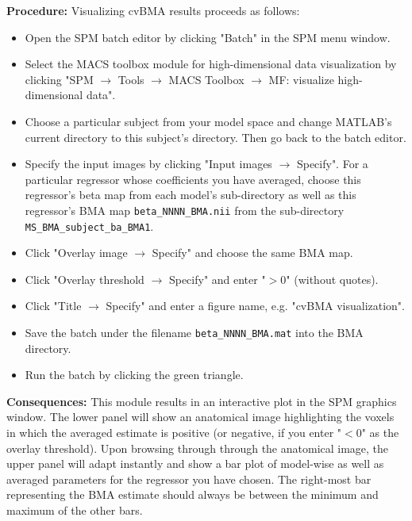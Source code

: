 \documentclass[a4paper,12pt]{article}
\newcommand{\ra}{$\rightarrow$ }
\begin{document}
\textbf{Procedure:} Visualizing cvBMA results proceeds as follows:
\begin{itemize}
	
\item
Open the SPM batch editor by clicking "Batch" in the SPM menu window.

\item
Select the MACS toolbox module for high-dimensional data visualization by clicking "SPM \ra Tools \ra MACS Toolbox \ra MF: visualize high-dimensional data".

\item
Choose a particular subject from your model space and change MATLAB's current directory to this subject's directory. Then go back to the batch editor.

\item
Specify the input images by clicking "Input images \ra Specify". For a particular regressor whose coefficients you have averaged, choose this regressor's beta map from each model's sub-directory as well as this regressor's BMA map \texttt{beta\_NNNN\_BMA.nii} from the sub-directory \texttt{MS\_BMA\_subject\_ba\_BMA1}.

\item
Click "Overlay image \ra Specify" and choose the same BMA map.

\item
Click "Overlay threshold \ra Specify" and enter "$>\!0$" (without quotes).

\item
Click "Title \ra Specify" and enter a figure name, e.g. "cvBMA visualization".

\item
Save the batch under the filename \texttt{beta\_NNNN\_BMA.mat} into the BMA directory.

\item
Run the batch by clicking the green triangle.
	
\end{itemize}

\textbf{Consequences:} This module results in an interactive plot in the SPM graphics window. The lower panel will show an anatomical image highlighting the voxels in which the averaged estimate is positive (or negative, if you enter "$<0$" as the overlay threshold). Upon browsing through through the anatomical image, the upper panel will adapt instantly and show a bar plot of model-wise as well as averaged parameters for the regressor you have chosen. The right-most bar representing the BMA estimate should always be between the minimum and maximum of the other bars.
\end{document}
